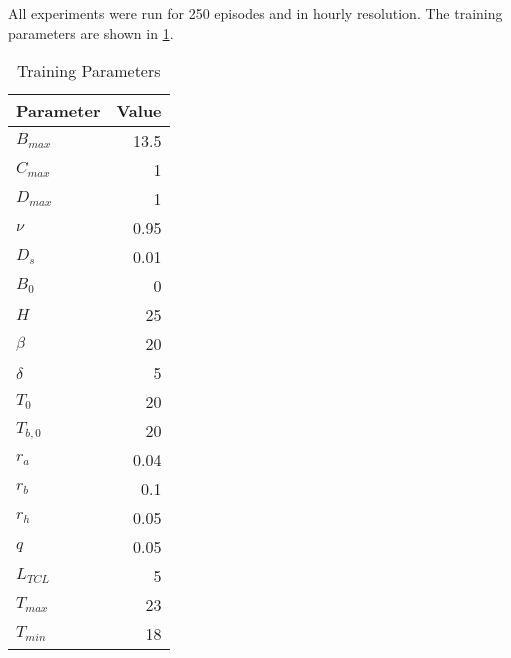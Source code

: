 \documentclass{article}
\theoremstyle{plain}
\theoremstyle{definition}
\theoremstyle{remark}
\begin{document}
All experiments were run for 250 episodes and in hourly resolution. The training parameters are shown in \ref{tab:training_parameters}. 
\begin{table}[H]
\label{tab:training_parameters}
\caption{Training Parameters}
\vskip 0.15in
\begin{center}
\begin{small}
\begin{sc}
\begin{tabular}{lr}
\toprule
Parameter & Value\\
\midrule
$B_{max}$ & 13.5 \\
$C_{max}$ & 1 \\
$D_{max}$ & 1 \\
$\nu$ & 0.95 \\
$D_s$ & 0.01 \\
$B_0$ & 0 \\
$H$ & 25 \\
$\beta$ & 20 \\
$\delta$ & 5 \\
$T_{0}$ & 20 \\
$T_{b,0}$ & 20 \\
$r_{a}$ & 0.04 \\
$r_{b}$ & 0.1 \\
$r_{h}$ & 0.05 \\
$q$ & 0.05 \\
$L_{TCL}$ & 5 \\
$T_{max}$ & 23 \\
$T_{min}$ & 18 \\
\bottomrule
\end{tabular}
\end{sc}
\end{small}
\end{center}
\vskip -0.1in
\end{table}

\end{document}
